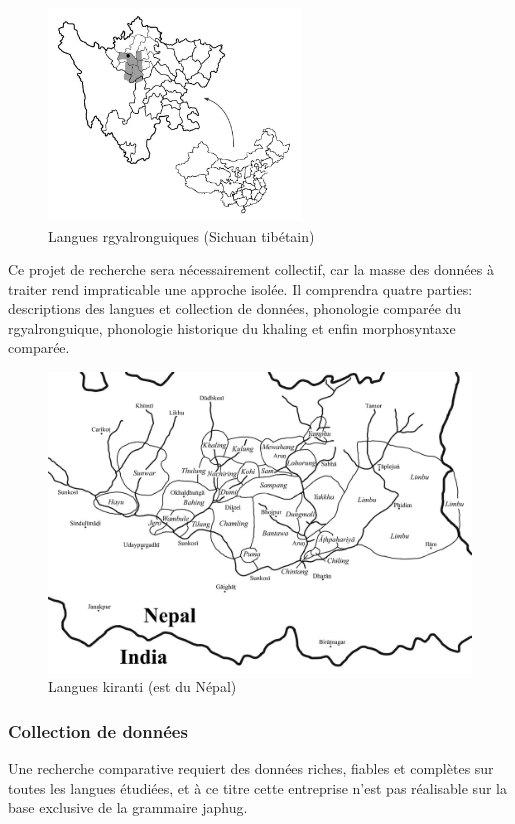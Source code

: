 \documentclass[oldfontcommands,oneside,a4paper,11pt]{article}
\begin{document}
   \begin{figure}[h]
   \caption{Langues rgyalronguiques (Sichuan tibétain) }  \label{fig:rgy}  \centering
 \includegraphics[width=0.6\textwidth]{carte.JPG}
 \end{figure}
Ce projet de recherche sera nécessairement collectif, car la masse des données à traiter rend impraticable une approche isolée. Il comprendra quatre parties: descriptions des langues et collection de données, phonologie comparée du rgyalronguique, phonologie historique du khaling et enfin morphosyntaxe comparée.

 \begin{figure}[h]
   \caption{Langues kiranti (est du Népal)} \label{fig:kirant}   \centering
  \includegraphics[width=\textwidth]{Kirant.jpeg} 
 \end{figure}
 
\subsubsection{Collection de données}
Une recherche comparative requiert des données riches, fiables et complètes sur toutes les langues étudiées, et à ce titre cette entreprise n'est pas réalisable sur la base exclusive de la grammaire japhug.
\end{document}

